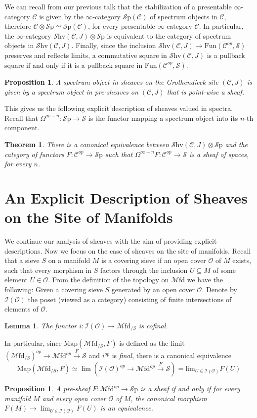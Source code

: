 \documentclass[10pt]{amsart}
\newcommand{\C}{\mathscr{C}}
\newcommand{\I}{\mathscr{I}}
\newcommand{\s}{\mathscr{S}}
\newcommand{\Map}{\mathrm{Map}}
\newcommand{\Sp}{\mathscr{S}\mathrm{p}}
\newcommand{\Fun}{\mathrm{Fun}}
\newcommand{\Mfd}{\mathscr{M}\mathrm{fd}}
\newcommand{\Shv}{\mathscr{S}\mathrm{hv}}
\newtheorem{theorem}[equation]{Theorem}
\newtheorem{lemma}[equation]{Lemma}
\newtheorem{proposition}[equation]{Proposition}
\theoremstyle{definition}
\theoremstyle{remark}
\numberwithin{equation}{section}
\begin{document}
We can recall from our previous talk that the stabilization of a presentable $\infty$-category $\C$ is given by the $\infty$-category $\Sp(\C)$ of spectrum objects in $\C$, therefore $\C\otimes\Sp  \simeq \Sp(\C)$, for every presentable $\infty$-category $\C$. In particular, the $\infty$-category $ \Shv(\C,J)\otimes \Sp$ is equivalent to the category of spectrum objects in $\Shv(\C,J)$. Finally, since the inclusion $\Shv(\C,J) \to \Fun(\C^{op},\s)$ preserves and reflects limits, a commutative square in $\Shv(\C,J)$ is a pullback square if and only if it is a pullback square in $\Fun(\C^{op},\s)$.

\begin{proposition}
  A spectrum object in sheaves on the Grothendieck site $(\C,J)$ is given by a spectrum object in pre-sheaves on $(\C,J)$ that is point-wise a sheaf.
\end{proposition}

This gives us the following explicit description of sheaves valued in spectra. Recall that $\Omega^{\infty-n}\colon\Sp\to\s$ is the functor mapping a spectrum object into its $n$-th component.
\begin{theorem}
  There is a canonical equivalence between $\Shv(\C,J)\otimes\Sp$ and the category of functors $F\colon \C^{op} \to \Sp$ such that $\Omega^{\infty - n} F\colon \C^{op} \to \s$ is a sheaf of spaces, for every $n$.
\end{theorem}

\section{An Explicit Description of Sheaves on the Site of Manifolds}
We continue our analysis of sheaves with the aim of providing explicit descriptions. Now we focus on the case of sheaves on the site of manifolds. Recall that a sieve $S$ on a manifold $M$ is a covering sieve if an open cover $\mathscr O$ of $M$ exists, such that every morphism in $S$ factors through the inclusion $U\subseteq M$ of some element $U\in\mathscr O$. From the definition of the topology on $\Mfd$ we have the following: Given a covering sieve $S$ generated by an open cover $\mathscr O$. Denote by $\I(\mathscr O)$ the poset (viewed as a category) consisting of finite intersections of elements of $\mathscr O$.
\begin{lemma}
	The functor $i:\I(\mathscr O)\rightarrow\Mfd_{/S}$ is cofinal.
\end{lemma}
In particular, since $\Map(\Mfd_{/S},F)$ is defined as the limit $(\Mfd_{/S})^{op}\to\Mfd^{op}\xrightarrow F\s$ and $i^{op}$ is \emph{final}, there is a canonical equivalence \[\Map(\Mfd_{/S},F)\simeq\lim(\I(\mathscr O)^{op}\to\Mfd^{op}\xrightarrow F\s)=\textrm{lim}_{U\in\I(\mathscr O)}F(U)\]
\begin{proposition}\label{pro:sheaf}
  A pre-sheaf $F\colon \Mfd^{op} \to \Sp$ is a sheaf if and only if for every manifold $M$ and every open cover $\mathscr O$ of $M$, the canonical morphism $F(M) \to \lim_{U \in \I(\mathscr O)}F(U)$ is an equivalence.
\end{proposition}
\end{document}

